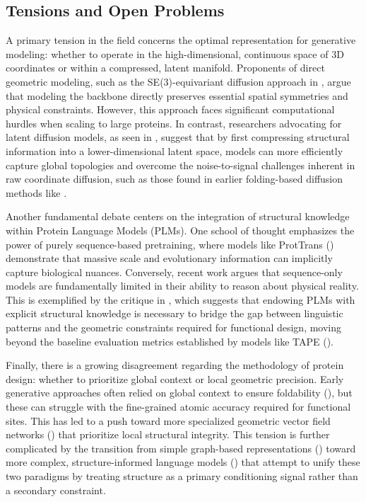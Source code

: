 \documentclass[11pt]{article}
\begin{document}
\subsection{Tensions and Open Problems}

A primary tension in the field concerns the optimal representation for generative modeling: whether to operate in the high-dimensional, continuous space of 3D coordinates or within a compressed, latent manifold. Proponents of direct geometric modeling, such as the SE(3)-equivariant diffusion approach in \citep{2302.02277}, argue that modeling the backbone directly preserves essential spatial symmetries and physical constraints. However, this approach faces significant computational hurdles when scaling to large proteins. In contrast, researchers advocating for latent diffusion models, as seen in \citep{2305.04120}, suggest that by first compressing structural information into a lower-dimensional latent space, models can more efficiently capture global topologies and overcome the noise-to-signal challenges inherent in raw coordinate diffusion, such as those found in earlier folding-based diffusion methods like \citep{2209.15611}.

Another fundamental debate centers on the integration of structural knowledge within Protein Language Models (PLMs). One school of thought emphasizes the power of purely sequence-based pretraining, where models like ProtTrans (\citep{2007.06225}) demonstrate that massive scale and evolutionary information can implicitly capture biological nuances. Conversely, recent work argues that sequence-only models are fundamentally limited in their ability to reason about physical reality. This is exemplified by the critique in \citep{2401.14819}, which suggests that endowing PLMs with explicit structural knowledge is necessary to bridge the gap between linguistic patterns and the geometric constraints required for functional design, moving beyond the baseline evaluation metrics established by models like TAPE (\citep{1906.08230}).

Finally, there is a growing disagreement regarding the methodology of protein design: whether to prioritize global context or local geometric precision. Early generative approaches often relied on global context to ensure foldability (\citep{2204.10673}), but these can struggle with the fine-grained atomic accuracy required for functional sites. This has led to a push toward more specialized geometric vector field networks (\citep{2310.11802}) that prioritize local structural integrity. This tension is further complicated by the transition from simple graph-based representations (\citep{2202.01079}) toward more complex, structure-informed language models (\citep{2302.01649}) that attempt to unify these two paradigms by treating structure as a primary conditioning signal rather than a secondary constraint.
\end{document}
